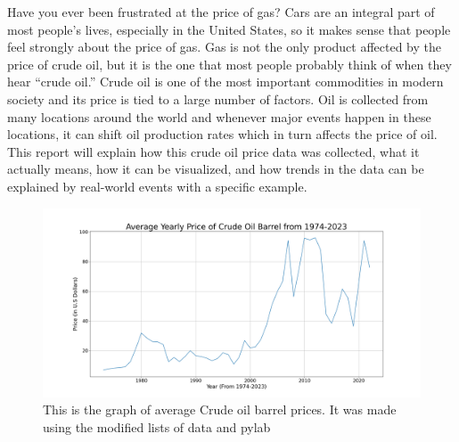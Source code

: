 Have you ever been frustrated at the price of gas? Cars are an integral part of most people’s lives, especially in the United States, so it makes sense that people feel strongly about the price of gas. Gas is not the only product affected by the price of crude oil, but it is the one that most people probably think of when they hear “crude oil.” Crude oil is one of the most important commodities in modern society and its price is tied to a large number of factors. Oil is collected from many locations around the world and whenever major events happen in these locations, it can shift oil production rates which in turn affects the price of oil. This report will explain how this crude oil price data was collected, what it actually means, how it can be visualized, and how trends in the data can be explained by real-world events with a specific example.


\begin{figure}
  \centering
  \includegraphics[width=1.0\textwidth]{OilPrice1.png}
  \caption{This is the graph of average Crude oil barrel prices. It was made using the modified lists of data and pylab}
 
  \label{fig:AverageOilPricePlot}
\end{figure}


